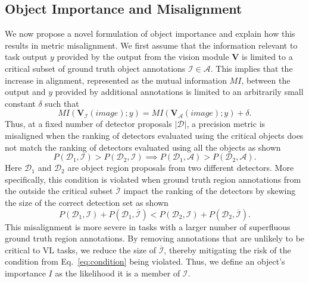 \documentclass[10pt,twocolumn,letterpaper]{article}
\begin{document}
\subsection{Object Importance and Misalignment}
We now propose a novel formulation of object importance and explain how this results in metric misalignment. We first assume that the information relevant to task output $y$ provided by the output from the vision module $\textbf{V}$ is limited to a critical subset of ground truth object annotations $\mathcal{I} \! \in \! \mathcal{A}$. This implies that the increase in alignment, represented as the mutual information $MI$, between the output and $y$ provided by additional annotations is limited to an arbitrarily small constant $\delta$ such that
\begin{equation}
MI(\textbf{V}_{\mathcal{I}}(image);y)=MI(\textbf{V}_{\mathcal{A}}(image);y)+\delta.
\end{equation}
Thus, at a fixed number of detector proposals $|\mathcal{D}|$, a precision metric is misaligned when the ranking of detectors evaluated using the critical objects does not match the ranking of detectors evaluated using all the objects as shown
\begin{equation}
\label{eq:condition}
P(\mathcal{D}_1,\mathcal{I}) \! > \! P(\mathcal{D}_2,\mathcal{I}) \! \! \implies \! \! P(\mathcal{D}_1,\mathcal{A}) \! > \! P(\mathcal{D}_2,\mathcal{A}).
\end{equation}
Here $\mathcal{D}_1$ and $\mathcal{D}_2$ are object region proposals from two different detectors. More specifically, this condition is violated when ground truth region annotations from the outside the critical subset $\overline{\mathcal{I}}$ impact the ranking of the detectors by skewing the size of the correct detection set as shown
\begin{equation}
P(\mathcal{D}_1,\mathcal{I})+P(\mathcal{D}_1,\overline{\mathcal{I}}) < P(\mathcal{D}_2,\mathcal{I})+P(\mathcal{D}_2,\overline{\mathcal{I}}).
\end{equation}
This misalignment is more severe in tasks with a larger number of superfluous ground truth region annotations. By removing annotations that are unlikely to be critical to VL tasks, we reduce the size of $\overline{\mathcal{I}}$, thereby mitigating the risk of the condition from Eq.~\ref{eq:condition} being violated. Thus, we define an object's importance $I$ as the likelihood it is a member of $\mathcal{I}$.
\end{document}
